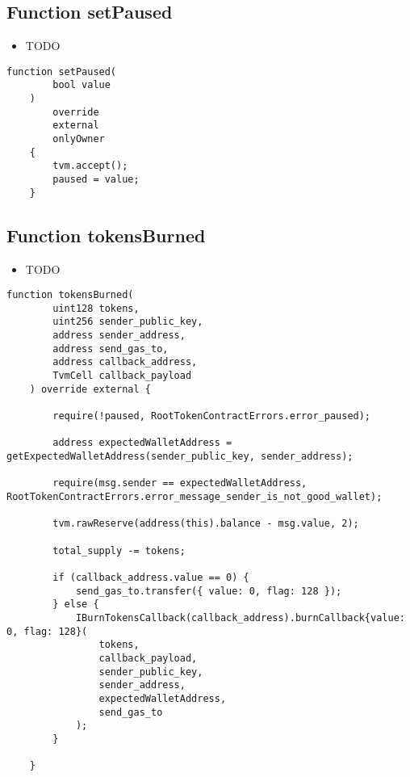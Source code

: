 \subsection{Function setPaused}

\noindent\begin{itemize}
\item TODO
\end{itemize}

\begin{lstlisting}[firstnumber=408]
    function setPaused(
        bool value
    )
        override
        external
        onlyOwner
    {
        tvm.accept();
        paused = value;
    }
\end{lstlisting}

\subsection{Function tokensBurned}

\noindent\begin{itemize}
\item TODO
\end{itemize}

\begin{lstlisting}[firstnumber=348]
    function tokensBurned(
        uint128 tokens,
        uint256 sender_public_key,
        address sender_address,
        address send_gas_to,
        address callback_address,
        TvmCell callback_payload
    ) override external {

        require(!paused, RootTokenContractErrors.error_paused);

        address expectedWalletAddress = getExpectedWalletAddress(sender_public_key, sender_address);

        require(msg.sender == expectedWalletAddress, RootTokenContractErrors.error_message_sender_is_not_good_wallet);

        tvm.rawReserve(address(this).balance - msg.value, 2);

        total_supply -= tokens;

        if (callback_address.value == 0) {
            send_gas_to.transfer({ value: 0, flag: 128 });
        } else {
            IBurnTokensCallback(callback_address).burnCallback{value: 0, flag: 128}(
                tokens,
                callback_payload,
                sender_public_key,
                sender_address,
                expectedWalletAddress,
                send_gas_to
            );
        }

    }
\end{lstlisting}

